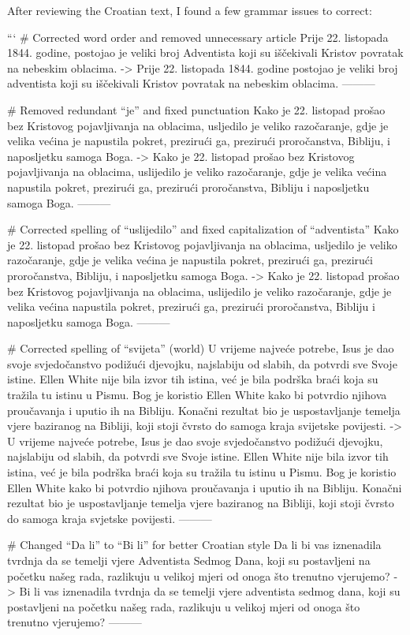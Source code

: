 After reviewing the Croatian text, I found a few grammar issues to correct:

```
# Corrected word order and removed unnecessary article
Prije 22. listopada 1844. godine, postojao je veliki broj Adventista koji su iščekivali Kristov povratak na nebeskim oblacima.
->
Prije 22. listopada 1844. godine postojao je veliki broj adventista koji su iščekivali Kristov povratak na nebeskim oblacima.
---------

# Removed redundant “je” and fixed punctuation
Kako je 22. listopad prošao bez Kristovog pojavljivanja na oblacima, usljedilo je veliko razočaranje, gdje je velika većina je napustila pokret, prezirući ga, prezirući proročanstva, Bibliju, i naposljetku samoga Boga.
->
Kako je 22. listopad prošao bez Kristovog pojavljivanja na oblacima, uslijedilo je veliko razočaranje, gdje je velika većina napustila pokret, prezirući ga, prezirući proročanstva, Bibliju i naposljetku samoga Boga.
---------

# Corrected spelling of “uslijedilo” and fixed capitalization of “adventista”
Kako je 22. listopad prošao bez Kristovog pojavljivanja na oblacima, usljedilo je veliko razočaranje, gdje je velika većina je napustila pokret, prezirući ga, prezirući proročanstva, Bibliju, i naposljetku samoga Boga.
->
Kako je 22. listopad prošao bez Kristovog pojavljivanja na oblacima, uslijedilo je veliko razočaranje, gdje je velika većina napustila pokret, prezirući ga, prezirući proročanstva, Bibliju i naposljetku samoga Boga.
---------

# Corrected spelling of “svijeta” (world)
U vrijeme najveće potrebe, Isus je dao svoje svjedočanstvo podižući djevojku, najslabiju od slabih, da potvrdi sve Svoje istine. Ellen White nije bila izvor tih istina, već je bila podrška braći koja su tražila tu istinu u Pismu. Bog je koristio Ellen White kako bi potvrdio njihova proučavanja i uputio ih na Bibliju. Konačni rezultat bio je uspostavljanje temelja vjere baziranog na Bibliji, koji stoji čvrsto do samoga kraja svijetske povijesti.
->
U vrijeme najveće potrebe, Isus je dao svoje svjedočanstvo podižući djevojku, najslabiju od slabih, da potvrdi sve Svoje istine. Ellen White nije bila izvor tih istina, već je bila podrška braći koja su tražila tu istinu u Pismu. Bog je koristio Ellen White kako bi potvrdio njihova proučavanja i uputio ih na Bibliju. Konačni rezultat bio je uspostavljanje temelja vjere baziranog na Bibliji, koji stoji čvrsto do samoga kraja svjetske povijesti.
---------

# Changed “Da li” to “Bi li” for better Croatian style
Da li bi vas iznenadila tvrdnja da se temelji vjere Adventista Sedmog Dana, koji su postavljeni na početku našeg rada, razlikuju u velikoj mjeri od onoga što trenutno vjerujemo?
->
Bi li vas iznenadila tvrdnja da se temelji vjere adventista sedmog dana, koji su postavljeni na početku našeg rada, razlikuju u velikoj mjeri od onoga što trenutno vjerujemo?
---------

